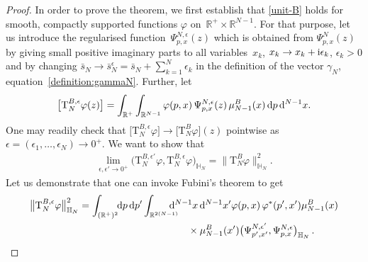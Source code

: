 \begin{proof}
In order to prove the theorem, we first establish that \eqref{unit-B} holds for smooth, compactly supported functions $\varphi$ on~$\mathbb{R}^+\times \mathbb{R}^{N-1}$. For that purpose, let us introduce the regularised function~$\Psi^{N,\epsilon}_{p,{x}}({z})$ which
is obtained from $\Psi^{N}_{p,{x}}({z})$ by giving small positive imaginary parts to all variables~$x_k$, $x_k\to x_k+{\rm i}\epsilon_k$,
$\epsilon_k>0$ and by changing $\bar s_N\to \bar s^{\epsilon}_N=\bar s_N+\sum_{k=1}^N \epsilon_k$ in the definition of the vector
$\gamma_N$, equation~\eqref{definition:gammaN}. Further, let
\begin{gather*}
\big[ \mathrm T_{N}^{B,\epsilon}\varphi( z)\big]
=\int_{\mathbb R^+} \int_{\mathbb R^{N-1}} \varphi(p, x)\,
 \Psi^{N,\epsilon}_{p,{x}}({z})\, \mu_{N-1}^{B}( x)\, {\rm d}p\, {\rm d}^{N-1} x.
\end{gather*}
One may readily check that $\big[ \mathrm T_{N}^{B,\epsilon}\varphi\big] \rightarrow\big[ \mathrm T_{N}^{B}\varphi\big]( z)$ pointwise as $\epsilon
=(\epsilon_1,\dots, \epsilon_N)\rightarrow 0^+$. We want to show that
\begin{gather*}
\lim_{\epsilon, \epsilon' \rightarrow 0^+} \big( \mathrm T_{N}^{B,\epsilon'} \varphi,
\mathrm T_{N}^{B,\epsilon}\varphi \big)_{\mathbb H_N} = \big\|\mathrm T_{N}^{B}\varphi\big\|_{\mathbb H_N}^2.
\end{gather*}
Let us demonstrate that one can invoke Fubini's theorem to get
\begin{gather*}
\big\|\mathrm T_{N}^{B,\epsilon}\varphi\big\|_{\mathbb H_N}^2
= \int_{(\mathbb R^+)^2}\!\!{\rm d}p\, {\rm d}p^{\prime} \int_{\mathbb R^{2(N-1)} }
\hspace{-4mm} {\rm d}^{N-1} x\, {\rm d}^{N-1} {x}' \varphi(p, x)\,\varphi^*(p', {x}')\mu_{N-1}^{B}( x)
\\ \hphantom{\big\|\mathrm T_{N}^{B,\epsilon}\varphi\big\|_{\mathbb H_N}^2
= \int_{(\mathbb R^+)^2}\!\!{\rm d}p\, {\rm d}p^{\prime} \int\quad}
{}\times \mu_{N-1}^{B}( {x}') \big(\Psi^{N,\epsilon'}_{p',{x}'},\Psi^{N,\epsilon}_{p,{x}}\big)_{\mathbb H_N} \, .
\end{gather*}



\end{proof}
